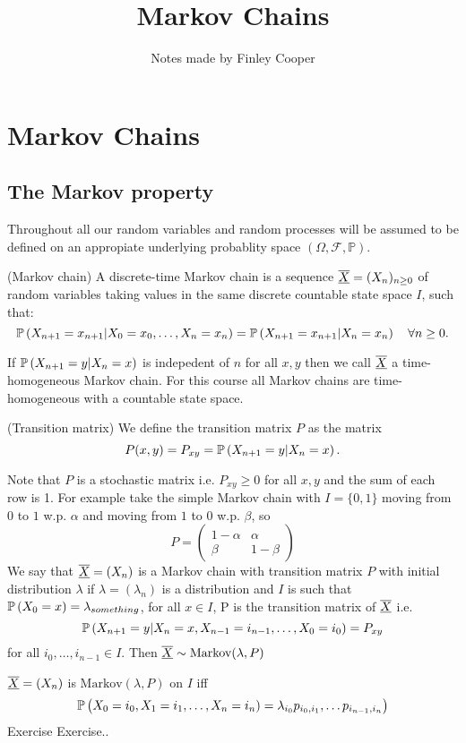 \documentclass{article}
\title{Markov Chains}
\author{Notes made by Finley Cooper}
\begin{document}
  \maketitle
  \newpage
  \tableofcontents
  \newpage
  \section{Markov Chains}
  \subsection{The Markov property}
  Throughout all our random variables and random processes will be assumed to be defined on an appropiate underlying probablity space $ (\Omega, \mathcal F, \mathbb P) $.
  \begin{definition}
  (Markov chain) A discrete-time Markov chain is a sequence $ \underline{\overline{X}}=(X_n)_{n\ge 0} $ of random variables taking values in the same discrete countable state space $ I $, such that:
	  \[
		  \mathbb{P}\left({X_{n+1}=x_{n+1}|X_0=x_0,\dots, X_n=x_n}\right)=\mathbb{P}\left({X_{n+1}=x_{n+1}|X_n=x_n}\right)\quad \forall n\ge 0.
	  \]
  \end{definition}
  If $ \mathbb{P}\left({X_{n+1} = y | X_n = x}\right) $ is indepedent of $ n $ for all $ x,y $ then we call $ \underline{\overline{X}} $ a time-homogeneous Markov chain. For this course all Markov chains are time-homogeneous with a countable state space.\par
\begin{definition}
	(Transition matrix) We define the transition matrix $ P $ as the matrix
	\[
		P(x,y)=P_{xy}=\mathbb{P}\left({X_{n+1}=y|X_n=x}\right).
	\]
\end{definition}
Note that $ P $ is a stochastic matrix i.e. $ P_{xy}\ge 0  $ for all $ x,y $ and the sum of each row is 1.
For example take the simple Markov chain with $ I=\{0,1\} $ moving from $ 0 $ to $ 1 $ w.p. $ \alpha $ and moving from $ 1 $ to $ 0 $ w.p. $ \beta $,
so \[P = 
  \begin{pmatrix}
	  1-\alpha & \alpha \\
	  \beta & 1-\beta 
  \end{pmatrix}
\]
We say that $ \underline{\overline{X}}= (X_n) $ is a Markov chain with transition matrix $ P $ with initial distribution $ \lambda $ if $ \lambda=(\lambda_n) $ is a distribution and $ I $ is such that $ \mathbb{P}\left({X_0=x}\right)=\lambda_{something} $, for all $ x\in I $, P is the transition matrix of $ \underline{\overline{X}} $ i.e.
\[
	\mathbb{P}\left({X_{n+1}=y|X_n=x,X_{n-1}=i_{n-1},\dots, X_0=i_0}\right)=P_{xy}
\]
for all $ i_0,\dots, i_{n-1}\in I $. Then $ \underline{\overline{X}}\sim \text{Markov}(\lambda, P) $
\begin{theorem}
$ \underline{\overline{X}} = (X_n)$ is $ \text{Markov}(\lambda, P) $ on $ I $ iff
\[
\mathbb{P}\left({X_0=i_0,X_1=i_1,\dots, X_n=i_n)=\lambda_{i_0}p_{i_0,i_1},\dots p_{i_{n-1},i_n}}\right)
\]
\pf Exercise
\pf Exercise..
\end{theorem} 
\end{document}
